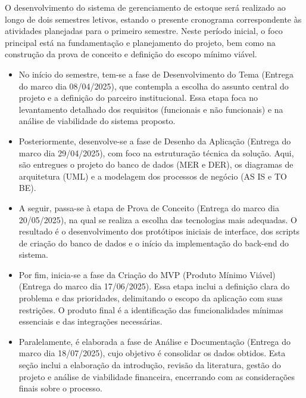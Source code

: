 \documentclass[
	12pt,				%
	openany,			%
	twoside,			%
	a4paper,			%
	english,			%
	brazil				%
	]{abntex2}
\begin{document}
O desenvolvimento do sistema de gerenciamento de estoque será realizado ao longo de dois semestres letivos, estando o presente cronograma correspondente às atividades planejadas para o primeiro semestre. Neste período inicial, o foco principal está na fundamentação e planejamento do projeto, bem como na construção da prova de conceito e definição do escopo mínimo viável.

\begin{itemize}

\item No início do semestre, tem-se a fase de Desenvolvimento do Tema (Entrega do marco dia 08/04/2025), que contempla a escolha do assunto central do projeto e a definição do parceiro institucional. Essa etapa foca no levantamento detalhado dos requisitos (funcionais e não funcionais) e na análise de viabilidade do sistema proposto.

\item Posteriormente, desenvolve-se a fase de Desenho da Aplicação (Entrega do marco dia 29/04/2025), com foco na estruturação técnica da solução. Aqui, são entregues o projeto do banco de dados (MER e DER), os diagramas de arquitetura (UML) e a modelagem dos processos de negócio (AS IS e TO BE).

\item A seguir, passa-se à etapa de Prova de Conceito (Entrega do marco dia 20/05/2025), na qual se realiza a escolha das tecnologias mais adequadas. O resultado é o desenvolvimento dos protótipos iniciais de interface, dos scripts de criação do banco de dados e o início da implementação do back-end do sistema.

\item Por fim, inicia-se a fase da Criação do MVP (Produto Mínimo Viável) (Entrega do marco dia 17/06/2025). Essa etapa inclui a definição clara do problema e das prioridades, delimitando o escopo da aplicação com suas restrições. O produto final é a identificação das funcionalidades mínimas essenciais e das integrações necessárias.

\item Paralelamente, é elaborada a fase de Análise e Documentação (Entrega do marco dia 18/07/2025), cujo objetivo é consolidar os dados obtidos. Esta seção inclui a elaboração da introdução, revisão da literatura, gestão do projeto e análise de viabilidade financeira, encerrando com as considerações finais sobre o processo.
\end{itemize}

\end{document}
